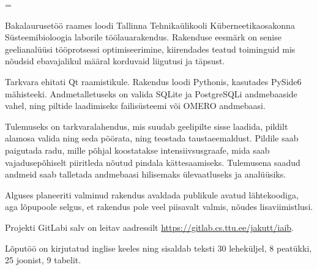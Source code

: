 {
  \emergencystretch=\maxdimen

Bakalaurusetöö raames loodi Tallinna Tehnikaülikooli Küberneetikaosakonna Süsteemibioloogia laborile töölauarakendus. Rakenduse eesmärk on senise geelianalüüsi tööprotsessi optimiseerimine, kiirendades teatud toiminguid mis nõudsid ebavajalikul määral korduvaid liigutusi ja täpsust.

Tarkvara ehitati Qt raamistikule. Rakendus loodi Pythonis, kasutades PySide6 mähisteeki.
Andmetalletuseks on valida SQLite ja PostgreSQLi andmebaaside vahel, ning piltide laadimiseks failisüsteemi või OMERO andmebaasi.

Tulemuseks on tarkvaralahendus, mis suudab geelipilte sisse laadida, pildilt alamosa valida ning seda pöörata, ning teostada taustaeemaldust. Pildile saab paigutada radu, mille põhjal koostatakse intensiivsusgraafe, mida saab vajadusepõhiselt piiritleda nõutud pindala kättesaamiseks. Tulemusena saadud andmeid saab talletada andmebaasi hilisemaks ülevaatluseks ja analüüsiks.

Alguses planeeriti valminud rakendus avaldada publikule avatud lähtekoodiga, aga lõpupoole selgus, et rakendus pole veel piisavalt valmis, nõudes lisaviimistlusi.

Projekti GitLabi salv on leitav aadressilt \url{https://gitlab.cs.ttu.ee/jakutt/iaib}.

Lõputöö on kirjutatud inglise keeles ning sisaldab teksti 30 leheküljel, 8 peatükki, 25 joonist, 9 tabelit.

}
